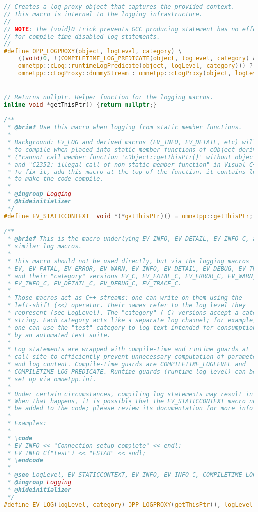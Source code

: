 \begin{lstlisting}[language=c]
// Creates a log proxy object that captures the provided context.
// This macro is internal to the logging infrastructure.
//
// NOTE: the (void)0 trick prevents GCC producing statement has no effect warnings
// for compile time disabled log statements.
//
#define OPP_LOGPROXY(object, logLevel, category) \
    ((void)0, !(COMPILETIME_LOG_PREDICATE(object, logLevel, category) && \
    omnetpp::cLog::runtimeLogPredicate(object, logLevel, category))) ? \
    omnetpp::cLogProxy::dummyStream : omnetpp::cLogProxy(object, logLevel, category, __FILE__, __LINE__, __FUNCTION__)


// Returns nullptr. Helper function for the logging macros.
inline void *getThisPtr() {return nullptr;}

/**
 * @brief Use this macro when logging from static member functions.
 *
 * Background: EV_LOG and derived macros (EV_INFO, EV_DETAIL, etc) will fail
 * to compile when placed into static member functions of cObject-derived classes
 * ("cannot call member function 'cObject::getThisPtr()' without object" in GNU C++,
 * and "C2352: illegal call of non-static member function" in Visual C++).
 * To fix it, add this macro at the top of the function; it contains local declarations
 * to make the code compile.
 *
 * @ingroup Logging
 * @hideinitializer
 */
#define EV_STATICCONTEXT  void *(*getThisPtr)() = omnetpp::getThisPtr;

/**
 * @brief This is the macro underlying EV_INFO, EV_DETAIL, EV_INFO_C, and
 * similar log macros.
 *
 * This macro should not be used directly, but via the logging macros
 * EV, EV_FATAL, EV_ERROR, EV_WARN, EV_INFO, EV_DETAIL, EV_DEBUG, EV_TRACE,
 * and their "category" versions EV_C, EV_FATAL_C, EV_ERROR_C, EV_WARN_C,
 * EV_INFO_C, EV_DETAIL_C, EV_DEBUG_C, EV_TRACE_C.
 *
 * Those macros act as C++ streams: one can write on them using the
 * left-shift (<<) operator. Their names refer to the log level they
 * represent (see LogLevel). The "category" (_C) versions accept a category
 * string. Each category acts like a separate log channel; for example,
 * one can use the "test" category to log text intended for consumption
 * by an automated test suite.
 *
 * Log statements are wrapped with compile-time and runtime guards at the
 * call site to efficiently prevent unnecessary computation of parameters
 * and log content. Compile-time guards are COMPILETIME_LOGLEVEL and
 * COMPILETIME_LOG_PREDICATE. Runtime guards (runtime log level) can be
 * set up via omnetpp.ini.
 *
 * Under certain circumstances, compiling log statements may result in errors.
 * When that happens, it is possible that the EV_STATICCONTEXT macro needs to
 * be added to the code; please review its documentation for more info.
 *
 * Examples:
 *
 * \code
 * EV_INFO << "Connection setup complete" << endl;
 * EV_INFO_C("test") << "ESTAB" << endl;
 * \endcode
 *
 * @see LogLevel, EV_STATICCONTEXT, EV_INFO, EV_INFO_C, COMPILETIME_LOGLEVEL, COMPILETIME_LOG_PREDICATE
 * @ingroup Logging
 * @hideinitializer
 */
#define EV_LOG(logLevel, category) OPP_LOGPROXY(getThisPtr(), logLevel, category).getStream()


\end{lstlisting}
